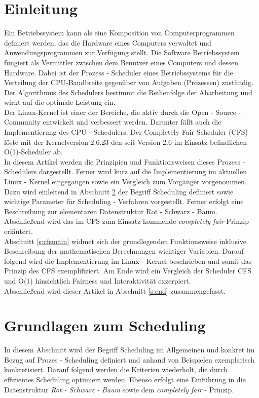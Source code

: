 \documentclass[ngerman]{seminarvorlage}
\begin{document}
\section{Einleitung}
Ein Betriebssystem kann als eine Komposition von Computerprogrammen definiert werden, das die Hardware eines Computers verwaltet und Anwendungsprogrammen zur Verfügung stellt. Die Software Betriebssystem fungiert als Vermittler zwischen dem Benutzer eines Computers und dessen Hardware. Dabei ist der Prozess - Scheduler eines Betriebssystems für die Verteilung der CPU-Bandbreite gegenüber von Aufgaben (Prozessen) zuständig. Der Algorithmus des Schedulers bestimmt die Reihenfolge der Abarbeitung und wirkt auf die optimale Leistung ein.\\
Der Linux-Kernel ist einer der Bereiche, die aktiv durch die Open - Source - Community entwickelt und verbessert werden. Darunter fällt auch die Implementierung des CPU - Schedulers. Der Completely Fair Scheduler (CFS) löste mit der Kernelversion 2.6.23 den seit Version 2.6 im Einsatz befindlichen O(1)-Scheduler ab.\\
In diesem Artikel werden die Prinzipien und Funktionsweisen dieses Prozess - Schedulers dargestellt. Ferner wird kurz auf die Implementierung im aktuellen Linux - Kernel eingegangen sowie ein Vergleich zum Vorgänger vorgenommen.\\
Dazu wird einleitend in Abschnitt \ref{s:basics} der Begriff Scheduling definiert sowie wichtige Parameter für Scheduling - Verfahren vorgestellt. Ferner erfolgt eine Beschreibung zur elementaren Datenstruktur Rot - Schwarz - Baum. Abschließend wird das im CFS zum Einsatz kommende \textit{completely fair} Prinzip erläutert.\\
Abschnitt \ref{s:cfsmain} widmet sich der grundlegenden Funktionsweise inklusive Beschreibung der mathematischen Berechnungen wichtiger Variablen. Darauf folgend wird die Implementierung im Linux - Kernel beschrieben und somit das Prinzip des CFS exemplifiziert. Am Ende wird ein Vergleich der Scheduler CFS und O(1) hinsichtlich Fairness und Interaktivität exzerpiert. \\
Abschließend wird dieser Artikel in Abschnitt \autoref{s:end} zusammengefasst.

\section{Grundlagen zum Scheduling}\label{s:basics}
In diesem Abschnitt wird der Begriff Scheduling im Allgemeinen und konkret im Bezug auf Prozes - Scheduling definiert und anhand von Beispielen exemplarisch konkretisiert. 
Darauf folgend werden die Kriterien wiederholt, die durch effizientes Scheduling optimiert werden.
Ebenso erfolgt eine Einführung in die Datenstruktur \textit{Rot - Schwarz - Baum} sowie dem \textit{completely fair} - Prinzip.
\end{document}
